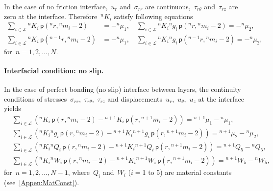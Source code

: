 \documentclass[preprint,10pt,times]{elsarticle}
\numberwithin{equation}{section}
\newcommand{\pr}[1]{\left( #1 \right)}
\newcommand{\p}{\,\mathsf{p}}
\renewcommand{\>}{$\Rightarrow$}
\begin{document}
In the case of no friction interface,~$u_r$ and~$\sigma_{rr}$ are continuous,~$\tau_{r\theta}$ and~$\tau_{rz}$ are zero at the interface. Therefore~${}^{n}\!{K_{i}}$ satisfy following equations
\begin{subequations}
	\begin{align}
	\sum_{i \in \mathcal{L}} {}^{n}\!{K_{i}} \p\pr{{}^{n}\!{r},{}^{n}\!{m_{i}} - 2} & = -{}^{n}\!{\mu_{1}}, \quad
	\sum_{i \in \mathcal{L}} {}^{n}\!{K_{i}} {}^{n}\!{g_{i}} \p\pr{{}^{n}\!{r},{}^{n}\!{m_{i}} - 2} = -{}^{n}\!{\mu_{2}}, \\
	\sum_{i \in \mathcal{L}} {}^{n}\!{K_{i}} \p\pr{{}^{n-1}\!{r},{}^{n}\!{m_{i}} - 2} & = -{}^{n}\!{\mu_{1}}, \quad
	\sum_{i \in \mathcal{L}} {}^{n}\!{K_{i}} {}^{n}\!{g_{i}} \p\pr{{}^{n-1}\!{r},{}^{n}\!{m_{i}} - 2} = -{}^{n}\!{\mu_{2}},
	\end{align}
	\label{eq:nofriction_interface}
\end{subequations}
for~$n = 1,2,\dots,N$.


\paragraph{Interfacial condition: no slip.}

In the case of perfect bonding (no slip) interface between layers, the continuity conditions of stresses~$\sigma_{rr}$,~$\tau_{r\theta}$,~$\tau_{rz}$ and displacements~$u_{r}$,~$u_{\theta}$,~$u_z$ at the interface yields
\begin{subequations}
	\begin{align}
	& \sum_{i \in \mathcal{L}} \left( {}^{n}\!{K_{i}} \p\pr{r,{}^{n}\!{m_{i}} - 2} - {}^{n+1}\!{K_{i}} \p\pr{r,{}^{n+1}\!{m_{i}} - 2} \right) = {}^{n+1}\!{\mu_{1}}
  - {}^{n}\!{\mu_{1}}, \\
	& \sum_{i \in \mathcal{L}} \left( {}^{n}\!{K_{i}} {}^{n}\!{g_{i}} \p\pr{r,{}^{n}\!{m_{i}} - 2} - {}^{n+1}\!{K_{i}} {}^{n+1}\!{g_{i}} \p\pr{r,{}^{n+1}\!{m_{i}} - 2} \right) = {}^{n+1}\!{\mu_{2}} - {}^{n}\!{\mu_{2}}, \\
	& \sum_{i \in \mathcal{L}} \left( {}^{n}\!{K_{i}} {}^{n}\!{Q_{i}} \p\pr{r,{}^{n}\!{m_{i}} - 2} - {}^{n+1}\!{K_{i}} {}^{n+1}\!{Q_{i}} \p\pr{r,{}^{n+1}\!{m_{i}} - 2} \right) = {}^{n+1}\!{Q_{5}} - {}^{n}\!{Q_{5}}, \\
	& \sum_{i \in \mathcal{L}} \left( {}^{n}\!{K_{i}} {}^{n}\!{W_{i}} \p\pr{r,{}^{n}\!{m_{i}} - 2} - {}^{n+1}\!{K_{i}} {}^{n+1}\!{W_{i}} \p\pr{r,{}^{n+1}\!{m_{i}} - 2} \right) = {}^{n+1}\!{W_{5}} - {}^{n}\!{W_{5}},
	\end{align}
	\label{eq:noslip_interface}
\end{subequations}
for~$n = 1,2,\dots,N-1$, where~$Q_i$ and~$W_i$ ($i=$1 to 5) are material constants (see~\ref{Appen:MatConst}).
\end{document}
